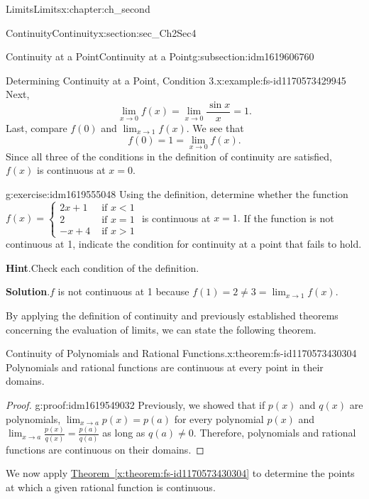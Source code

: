 \documentclass[oneside,10pt,]{book}
\newcommand{\blocktitlefont}{\relax}
\newcommand{\xreffont}{\relax}
\numberwithin{equation}{section}
\newcommand{\lt}{<}
\newcommand{\gt}{>}
\newcommand{\amp}{&}
\begin{document}
\begin{chapterptx}{Limits}{}{Limits}{}{}{x:chapter:ch_second}
\begin{sectionptx}{Continuity}{}{Continuity}{}{}{x:section:sec_Ch2Sec4}
\begin{subsectionptx}{Continuity at a Point}{}{Continuity at a Point}{}{}{g:subsection:idm1619606760}
\begin{example}{Determining Continuity at a Point, Condition 3.}{x:example:fs-id1170573429945}
\begin{equation*}
\end{equation*}
Next,%
%
\begin{equation*}
\lim_{x\to 0}f(x)=\lim_{x\to 0}\frac{\sin x}{x}=1.
\end{equation*}
Last, compare \(f(0)\) and \(\lim_{x\to 1}f(x).\) We see that%
%
\begin{equation*}
f(0)=1=\lim_{x\to 0}f(x).
\end{equation*}
Since all three of the conditions in the definition of continuity are satisfied, \(f(x)\) is continuous at \(x=0.\)%
\end{example}
\begin{inlineexercise}{}{g:exercise:idm1619555048}%
Using the definition, determine whether the function \(f(x)=\begin{cases}2x+1\amp\text{ if } x\lt 1\\2\amp\text{ if } x=1\\-x+4\amp\text{ if } x\gt 1 \end{cases}\) is continuous at \(x=1.\) If the function is not continuous at 1, indicate the condition for continuity at a point that fails to hold.%
\par\smallskip%
\noindent\textbf{\blocktitlefont Hint}.\hypertarget{g:hint:idm1619550824}{}\quad{}Check each condition of the definition.%
\par\smallskip%
\noindent\textbf{\blocktitlefont Solution}.\hypertarget{g:solution:idm1619551848}{}\quad{}\(f\) is not continuous at 1 because \(f(1)=2\neq 3=\lim_{x\to 1}f(x).\)%
\end{inlineexercise}%
By applying the definition of continuity and previously established theorems concerning the evaluation of limits, we can state the following theorem.%
\begin{theorem}{Continuity of Polynomials and Rational Functions.}{}{x:theorem:fs-id1170573430304}%
Polynomials and rational functions are continuous at every point in their domains.%
\end{theorem}
\begin{proof}{}{g:proof:idm1619549032}
Previously, we showed that if \(p(x)\) and \(q(x)\) are polynomials, \(\lim_{x\to a}p(x)=p(a)\) for every polynomial \(p(x)\) and \(\lim_{x\to a}\frac{p(x)}{q(x)}=\frac{p(a)}{q(a)}\) as long as \(q(a)\neq 0.\) Therefore, polynomials and rational functions are continuous on their domains.%
\end{proof}
We now apply \hyperref[x:theorem:fs-id1170573430304]{Theorem~{\xreffont\ref{x:theorem:fs-id1170573430304}}} to determine the points at which a given rational function is continuous.%

\end{subsectionptx}
\end{sectionptx}
\end{chapterptx}
\end{document}
